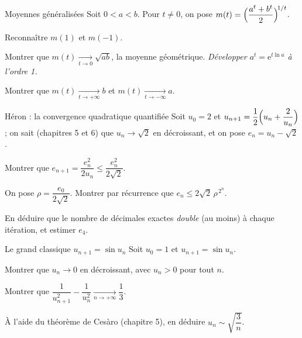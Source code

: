 
\begin{exercice}[3]{Moyennes généralisées}
Soit $0<a<b$. Pour $t\neq0$, on pose
$m(t)=\Bigl(\dfrac{a^{t}+b^{t}}{2}\Bigr)^{\!1/t}$.
\begin{questions}
  \item Reconnaître $m(1)$ et $m(-1)$.
  \item Montrer que $m(t)\xrightarrow[t\to0]{}\sqrt{ab}$, la moyenne
    géométrique. \emph{Développer $a^{t}=\mathrm{e}^{t\ln a}$ à l'ordre 1.}
  \item Montrer que $m(t)\xrightarrow[t\to+\infty]{}b$ et
    $m(t)\xrightarrow[t\to-\infty]{}a$.
\end{questions}
\end{exercice}

\begin{exercice}[3]{Héron : la convergence quadratique quantifiée}
Soit $u_0=2$ et $u_{n+1}=\dfrac12\Bigl(u_n+\dfrac{2}{u_n}\Bigr)$ ; on sait
(chapitres 5 et 6) que $u_n\to\sqrt2$ en décroissant, et on pose
$e_n=u_n-\sqrt2$.
\begin{questions}
  \item Montrer que $e_{n+1}=\dfrac{e_n^{2}}{2u_n}\leqslant\dfrac{e_n^{2}}{2\sqrt2}$.
  \item On pose $\rho=\dfrac{e_0}{2\sqrt2}$. Montrer par récurrence que
    $e_n\leqslant2\sqrt2\,\rho^{\,2^{n}}$.
  \item En déduire que le nombre de décimales exactes \emph{double}
    (au moins) à chaque itération, et estimer $e_4$.
\end{questions}
\end{exercice}

\begin{exercice}[3]{Le grand classique $u_{n+1}=\sin u_n$}
Soit $u_0=1$ et $u_{n+1}=\sin u_n$.
\begin{questions}
  \item Montrer que $u_n\to0$ en décroissant, avec $u_n>0$ pour tout $n$.
  \item Montrer que
    $\dfrac{1}{u_{n+1}^{2}}-\dfrac{1}{u_n^{2}}\xrightarrow[n\to+\infty]{}\dfrac13$.
  \item À l'aide du théorème de Cesàro (chapitre 5), en déduire
    $u_n\sim\sqrt{\dfrac{3}{n}}$.
\end{questions}
\end{exercice}

